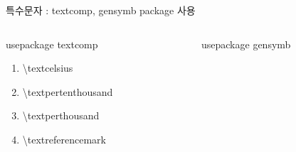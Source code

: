 \documentclass[ aspectratio=149,  10pt,blue,xcolor=pdftex,dvipsnames,table,handout,notes]{beamer}
\begin{document}
		\begin{frame}[t]{특수문자 : textcomp, gensymb package 사용 }

			\begin{columns}[t]
			\begin{column}{.4\textwidth}
					\begin{block} { usepackage textcomp }
					\begin{enumerate}
					\item[\textcelsius 		]	\textbackslash textcelsius
					\item[\textpertenthousand	]	\textbackslash textpertenthousand
					\item[\textperthousand		]	\textbackslash textperthousand
					\item[\textreferencemark	]	\textbackslash textreferencemark
					\end{enumerate}
					\end{block}
			\end{column}

			\begin{column}{.4\textwidth}
					\begin{block} { usepackage gensymb}
					\end{block}

			\end{column}
			\end{columns}

		\note[item]{}
		\end{frame}
\end{document}
